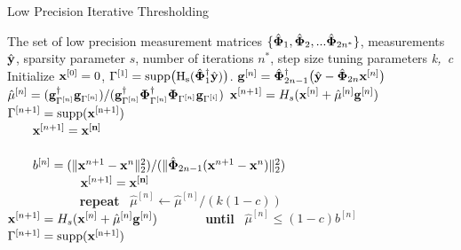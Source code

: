 \documentclass{article}
\begin{document}
\begin{algorithm}[t!]
   \small
   \caption{Low Precision Iterative Thresholding}
   \label{low_precision_iht}
\begin{algorithmic}
    The set of low precision measurement matrices $\{ \hat{\bf \Phi}_1, \hat{\bf \Phi}_2, ...\hat{\bf \Phi}_{2n^*}\}$, measurements $\hat{\bf y}$, sparsity parameter $s$, number of iterations $n^*$, step size tuning parameters {\it k,\ c} 
   \STATE Initialize ${\bf x}^{[0]} = 0$, $\Gamma^{[1]} = \rm{supp}\big (H_s(\hat{\bf \Phi}_1^{\dagger}{\hat{\bf y}})\big)$.
   \STATE ${\bf g}^{[n]} = {\hat{\bf \Phi}^{\dagger}}_{2n-1} \big(\hat{{\bf y}}-{\hat{\bf \Phi}}_{2n}{\bf x}^{[n]}\big)$
   \STATE $\hat{\bf \mu}^{[n]} = ({\bf g}^{\dagger}_{\Gamma^{[n]}}{\bf g}_{\Gamma^{[n]}})/({\bf g}^{\dagger}_{\Gamma^{[n]}}{\bf \Phi}^{\dagger}_{\Gamma^{[n]}}{\bf \Phi}_{\Gamma^{[n]}}{\bf g}_{\Gamma^{[i]}})$
   \STATE ${\bf x}^{[n+1]} = H_s({\bf x}^{[n]} + \hat{\bf \mu}^{[n]} {\bf g}^{[n]})$
   \STATE $\Gamma^{[n+1]} = \rm{supp}({\bf x}^{[n+1]})$\\
   \algorithmicif{  \ $\Gamma^{[n+1]}=\Gamma^{[n]}$}
   \STATE \ \ \ \ ${\bf x}^{[n+1]}=\bf{ x}^{[n]}$\\
   \algorithmicelse \ \algorithmicif{\ $\Gamma^{[n+1]}\neq \Gamma^{[n]}$}\\
   \STATE \ \ \ \ ${ b}^{[n]}=(\|{\bf x}^{n+1}-{\bf x}^{n} \|^2_2)/(\|\hat{\bf \Phi}_{2n-1}({\bf x}^{n+1}-{\bf x}^{n})\|^2_2)$\\
   \ \ \ \ 
   \STATE \ \ \ \ \ \ \ {${\bf x}^{[n+1]}=\bf {x}^{[n]}$}\\
   \ \ \ \ 
   \STATE \ \ \ \ \ \ \ {\bf repeat} \ {$\hat{\mu}^{[n]} \leftarrow \hat{\mu}^{[n]}/(k(1-c))$}
   \STATE \ \ \ \ \ \ \ ${\bf x}^{[n+1]} = H_s({\bf x}^{[n]} + \hat{\bf \mu}^{[n]} {\bf g}^{[n]})$
   \STATE \ \ \ \ \ \ \ {\bf until} \ {$\hat{\mu}^{[n]}\leq (1-{c})b^{[n]}$ }
   \STATE $\Gamma^{[n+1]} = \rm{supp}({\bf x}^{[n+1]})$
   \ENDFOR
\end{algorithmic}
\end{algorithm}
\end{document}
